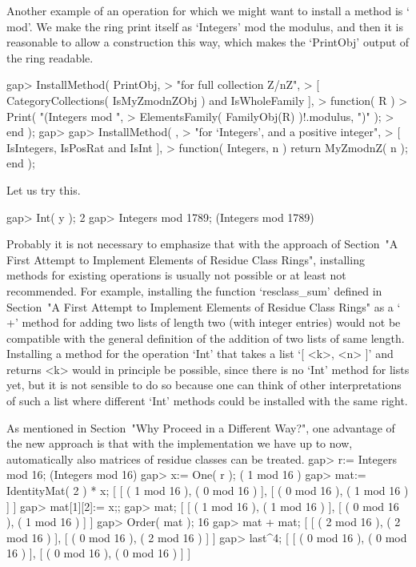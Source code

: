 Another example of an operation for which we might want to install
a method is `\\mod'.
We make the ring print itself as `Integers' mod the modulus,
and then it is reasonable to allow a construction this way,
which makes the `PrintObj' output of the ring {\GAP} readable.

\beginexample
gap> InstallMethod( PrintObj,
>    "for full collection Z/nZ",
>    [ CategoryCollections( IsMyZmodnZObj ) and IsWholeFamily ],
>    function( R )
>    Print( "(Integers mod ",
>           ElementsFamily( FamilyObj(R) )!.modulus, ")" );
>    end );
gap> 
gap> InstallMethod( \mod,
>    "for `Integers', and a positive integer",
>    [ IsIntegers, IsPosRat and IsInt ],
>    function( Integers, n ) return MyZmodnZ( n ); end );
\endexample

Let us try this.

\beginexample
gap> Int( y );
2
gap> Integers mod 1789;
(Integers mod 1789)
\endexample

Probably it is not necessary to emphasize that with the approach of
Section~"A First Attempt to Implement Elements of Residue Class Rings",
installing methods for existing operations is usually not possible or
at least not recommended.
For example, installing the function `resclass_sum' defined in
Section~"A First Attempt to Implement Elements of Residue Class Rings"
as a `\\+' method for adding two lists of length two
(with integer entries) would not be compatible with the general
definition of the addition of two lists of same length.
Installing a method for the operation `Int' that takes a list
`[ <k>, <n> ]' and returns <k> would in principle be possible,
since there is no `Int' method for lists yet,
but it is not sensible to do so because one can think of other
interpretations of such a list where different `Int' methods could
be installed with the same right.

As mentioned in Section~"Why Proceed in a Different Way?",
one advantage of the new approach is that with the implementation
we have up to now, automatically also matrices of residue classes
can be treated.
\beginexample
gap> r:= Integers mod 16;
(Integers mod 16)
gap> x:= One( r );
( 1 mod 16 )
gap> mat:= IdentityMat( 2 ) * x;
[ [ ( 1 mod 16 ), ( 0 mod 16 ) ], [ ( 0 mod 16 ), ( 1 mod 16 ) ] ]
gap> mat[1][2]:= x;;
gap> mat;
[ [ ( 1 mod 16 ), ( 1 mod 16 ) ], [ ( 0 mod 16 ), ( 1 mod 16 ) ] ]
gap> Order( mat );
16
gap> mat + mat;
[ [ ( 2 mod 16 ), ( 2 mod 16 ) ], [ ( 0 mod 16 ), ( 2 mod 16 ) ] ]
gap> last^4;
[ [ ( 0 mod 16 ), ( 0 mod 16 ) ], [ ( 0 mod 16 ), ( 0 mod 16 ) ] ]
\endexample


